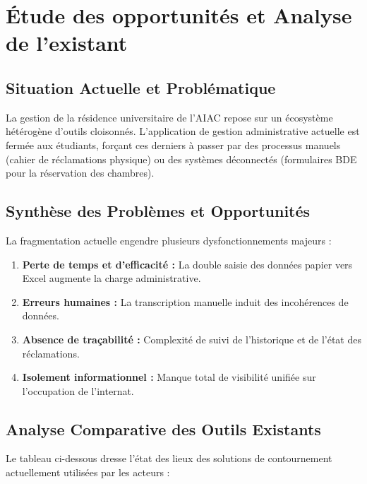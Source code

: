 \documentclass[a4paper,12pt]{article}
\begin{document}
\newpage

\section{Étude des opportunités et Analyse de l'existant}

\subsection{Situation Actuelle et Problématique}
La gestion de la résidence universitaire de l'AIAC repose sur un écosystème hétérogène d'outils cloisonnés. L'application de gestion administrative actuelle est fermée aux étudiants, forçant ces derniers à passer par des processus manuels (cahier de réclamations physique) ou des systèmes déconnectés (formulaires BDE pour la réservation des chambres).

\subsection{Synthèse des Problèmes et Opportunités}
La fragmentation actuelle engendre plusieurs dysfonctionnements majeurs :
\begin{enumerate}
    \item \textbf{Perte de temps et d'efficacité :} La double saisie des données papier vers Excel augmente la charge administrative.
    \item \textbf{Erreurs humaines :} La transcription manuelle induit des incohérences de données.
    \item \textbf{Absence de traçabilité :} Complexité de suivi de l'historique et de l'état des réclamations.
    \item \textbf{Isolement informationnel :} Manque total de visibilité unifiée sur l'occupation de l'internat.
\end{enumerate}

\subsection{Analyse Comparative des Outils Existants}
Le tableau ci-dessous dresse l'état des lieux des solutions de contournement actuellement utilisées par les acteurs :
\end{document}
